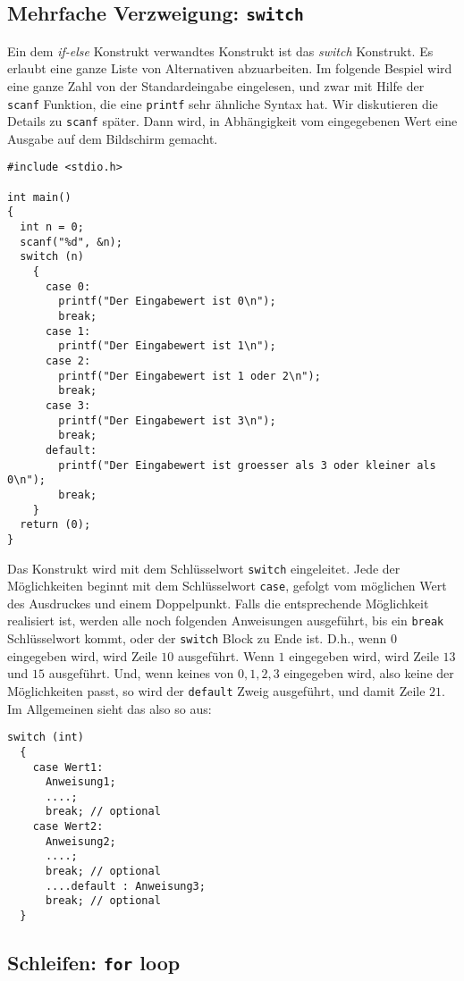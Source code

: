 \subsection{Mehrfache Verzweigung: \texttt{switch}}

Ein dem \emph{if-else} Konstrukt verwandtes Konstrukt ist das \emph{switch} Konstrukt.
Es erlaubt eine ganze Liste von Alternativen abzuarbeiten.
Im folgende Bespiel wird eine ganze Zahl von der Standardeingabe eingelesen, und zwar mit Hilfe der \verb|scanf| Funktion, die eine \verb|printf| sehr ähnliche Syntax hat.
Wir diskutieren die Details zu \verb|scanf| später.
Dann wird, in Abhängigkeit vom eingegebenen Wert eine Ausgabe auf dem Bildschirm gemacht.
\begin{lstlisting}
#include <stdio.h>

int main()
{
  int n = 0;
  scanf("%d", &n);
  switch (n)
    {
      case 0:
        printf("Der Eingabewert ist 0\n");
        break;
      case 1:
        printf("Der Eingabewert ist 1\n");
      case 2:
        printf("Der Eingabewert ist 1 oder 2\n");
        break;
      case 3:
        printf("Der Eingabewert ist 3\n");
        break;
      default:
        printf("Der Eingabewert ist groesser als 3 oder kleiner als 0\n");
        break;
    }
  return (0);
}
\end{lstlisting}
Das Konstrukt wird mit dem Schlüsselwort \verb|switch| eingeleitet.
Jede der Möglichkeiten beginnt mit dem Schlüsselwort \verb|case|, gefolgt vom möglichen Wert des Ausdruckes und einem Doppelpunkt. 
Falls die entsprechende Möglichkeit realisiert ist, werden alle noch folgenden Anweisungen ausgeführt, bis ein \verb|break| Schlüsselwort kommt, oder der \verb|switch| Block zu Ende ist.
D.h., wenn $0$ eingegeben wird, wird Zeile $10$ ausgeführt.
Wenn $1$ eingegeben wird, wird Zeile $13$ und $15$ ausgeführt.
Und, wenn keines von $0,1,2,3$ eingegeben wird, also keine der Möglichkeiten passt, so wird der \verb|default| Zweig ausgeführt, und damit Zeile $21$.
Im Allgemeinen sieht das also so aus:
\begin{lstlisting}
switch (int)
  {
    case Wert1:
      Anweisung1;
      ....;
      break; // optional
    case Wert2:
      Anweisung2;
      ....;
      break; // optional
      ....default : Anweisung3;
      break; // optional
  }
\end{lstlisting}

\subsection{Schleifen: \texttt{for} loop}

